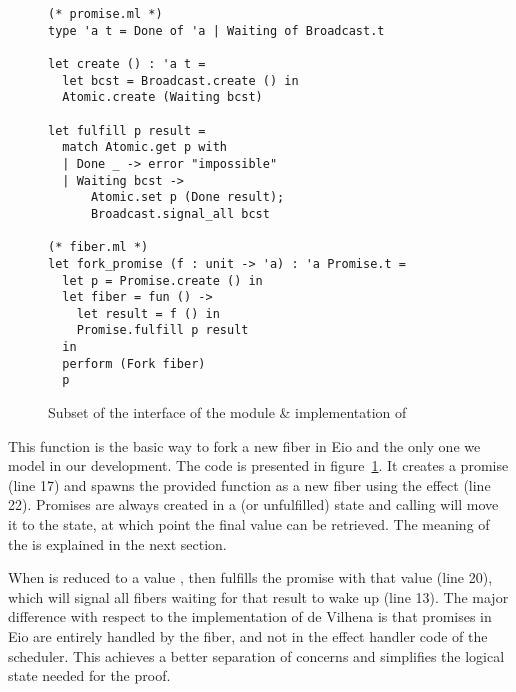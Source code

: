 \begin{figure}[ht]
  \begin{verbatim}
(* promise.ml *)
type 'a t = Done of 'a | Waiting of Broadcast.t

let create () : 'a t = 
  let bcst = Broadcast.create () in
  Atomic.create (Waiting bcst)

let fulfill p result =
  match Atomic.get p with
  | Done _ -> error "impossible"
  | Waiting bcst ->
      Atomic.set p (Done result);
      Broadcast.signal_all bcst
  
(* fiber.ml *)
let fork_promise (f : unit -> 'a) : 'a Promise.t =
  let p = Promise.create () in
  let fiber = fun () ->
    let result = f () in
    Promise.fulfill p result
  in
  perform (Fork fiber) 
  p
  \end{verbatim}
  \caption{Subset of the interface of the  module \& implementation of }
  \label{fig:sched-impl-fork}
\end{figure}

This function is the basic way to fork a new fiber in Eio and the only one we model in our development.
The code is presented in figure~\ref{fig:sched-impl-fork}.
It creates a promise (line 17) and spawns the provided function as a new fiber using the \efork{} effect (line 22).
Promises are always created in a  (or unfulfilled) state and calling  will move it to the  state, at which point the final value can be retrieved.
The meaning of the  is explained in the next section.

When  is reduced to a value ,  then fulfills the promise with that value (line 20), which will signal all fibers waiting for that result to wake up (line 13).
The major difference with respect to the implementation of de Vilhena is that promises in Eio are entirely handled by the fiber, and not in the effect handler code of the scheduler.
This achieves a better separation of concerns and simplifies the logical state needed for the proof.

\subsubsection{}
\label{sec:sched-impl-await}

